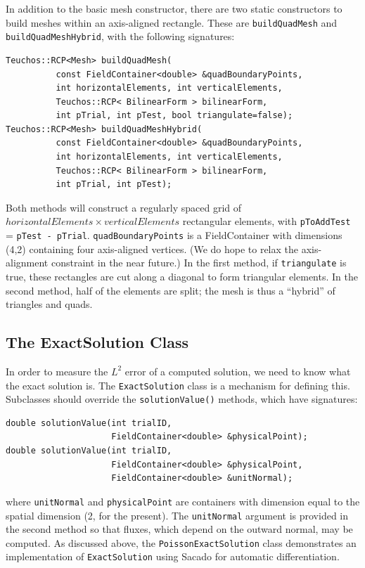 In addition to the basic mesh constructor, there are two static constructors to build meshes within an axis-aligned rectangle.  These are \verb=buildQuadMesh= and \verb=buildQuadMeshHybrid=, with the following signatures:
\begin{lstlisting}
Teuchos::RCP<Mesh> buildQuadMesh(
          const FieldContainer<double> &quadBoundaryPoints,
          int horizontalElements, int verticalElements,
          Teuchos::RCP< BilinearForm > bilinearForm, 
          int pTrial, int pTest, bool triangulate=false);
Teuchos::RCP<Mesh> buildQuadMeshHybrid(
          const FieldContainer<double> &quadBoundaryPoints, 
          int horizontalElements, int verticalElements,
          Teuchos::RCP< BilinearForm > bilinearForm, 
          int pTrial, int pTest);
\end{lstlisting}

Both methods will construct a regularly spaced grid of $horizontalElements \times verticalElements$ rectangular elements, with \verb=pToAddTest= = \verb=pTest - pTrial=.  \verb=quadBoundaryPoints= is a FieldContainer with dimensions (4,2) containing four axis-aligned vertices.  (We do hope to relax the axis-alignment constraint in the near future.)  In the first method, if \verb=triangulate= is true, these rectangles are cut along a diagonal to form triangular elements.  In the second method, half of the elements are split; the mesh is thus a ``hybrid'' of triangles and quads.

\subsection{The ExactSolution Class}\label{NVR:sec:ExactSolution}  In order to measure the $L^{2}$ error of a computed solution, we need to know what the exact solution is.  The \verb=ExactSolution= class is a mechanism for defining this.  Subclasses should override the \verb=solutionValue()= methods, which have signatures:
\begin{lstlisting}
double solutionValue(int trialID,
                     FieldContainer<double> &physicalPoint);
double solutionValue(int trialID,
                     FieldContainer<double> &physicalPoint,
                     FieldContainer<double> &unitNormal);
\end{lstlisting}
where \verb=unitNormal= and \verb=physicalPoint= are containers with dimension equal to the spatial dimension (2, for the present).  The \verb=unitNormal= argument is provided in the second method so that fluxes, which depend on the outward normal, may be computed.  As discussed above, the \verb=PoissonExactSolution= class demonstrates an implementation of \verb=ExactSolution= using Sacado for automatic differentiation.

